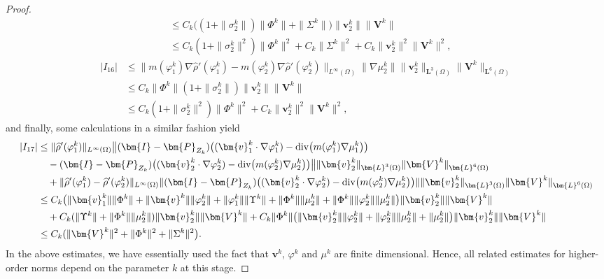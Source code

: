 \documentclass[11pt,reqno]{amsart}
\def\div{\mathrm{div}}
\def\vv{\bm{v}}
\begin{document}
\begin{proof}
\begin{align*}
&\leq C_k\big((1+\| \sigma^k_2\|)\| \Phi^k\|
+ \| \Sigma^k\|\big) \| \vv^k_2\| \|\bm{V}^k\|
\\
&\leq C_k (1+\| \sigma^k_2\|^2) \| \Phi^k\|^2
+ C_k\|\Sigma^k\|^2 + C_k\| \vv^k_2\|^2 \|\bm{V}^k\|^2,
\end{align*}
%
\begin{align*}
|I_{16}|
&\leq \|m(\varphi^k_1)\nabla \widehat{\rho}'(\varphi^k_1)
-m(\varphi^k_2)\nabla \widehat{\rho}'(\varphi^k_2)\|_{L^\infty(\Omega)}
\| \nabla \mu^k_2\| \|\vv^k_2\|_{\bm{L}^3(\Omega)} \|\bm{V}^k\|_{\bm{L}^6(\Omega)}
\\
&\leq C_k\|\Phi^k\|(1+\|\sigma_2^k\|)\| \vv^k_2\| \|\bm{V}^k\|
\\
&\leq C_k (1+\| \sigma^k_2\|^2) \| \Phi^k\|^2
+ C_k\| \vv^k_2\|^2 \|\bm{V}^k\|^2,
\end{align*}
%
and finally, some calculations in a similar fashion yield
%
\begin{align*}
|I_{17}|
&\leq \|\widehat{\rho}'(\varphi^k_1)\|_{L^\infty(\Omega)}
\big\|(\bm{I}-\bm{P}_{Z_{k}}) \big((\bm{v}_1^k\cdot\nabla\varphi^k_1)-\div \big(m(\varphi^k_1)\nabla \mu^k_1\big)\big)
\notag\\
&\quad -(\bm{I}-\bm{P}_{Z_{k}}) \big((\bm{v}_2^k\cdot\nabla\varphi^k_2)-\div \big(m(\varphi^k_2)\nabla \mu^k_2\big)\big)\big\|
\|\vv_2^k\|_{\bm{L}^3(\Omega)} \|\bm{V}^k\|_{\bm{L}^6(\Omega)}
\notag\\
&\quad + \|\widehat{\rho}'(\varphi^k_1)- \widehat{\rho}'(\varphi^k_2)\|_{L^\infty(\Omega)} \|(\bm{I}-\bm{P}_{Z_{k}}) \big((\bm{v}_2^k\cdot\nabla\varphi^k_2)-\div \big(m(\varphi^k_2)\nabla \mu^k_2\big)\big)\| \|\vv_2^k\|_{\bm{L}^3(\Omega)} \|\bm{V}^k\|_{\bm{L}^6(\Omega)}
\notag\\
&\leq C_k\big( \|\vv^k_1\| \|\Phi^k\|
+ \|\vv^k\|\|\varphi^k_2\|
+ \|\varphi^k_1\|\|\Upsilon^k\|
+ \|\Phi^k\|\|\mu^k_2\|
+ \|\Phi^k\|\|\varphi^k_2\|\|\mu^k_2\|\big)
\|\vv_2^k\| \|\bm{V}^k\|
\notag\\
&\quad + C_k(\|\Upsilon^k\|
+ \|\Phi^k\|\|\mu^k_2\|) \|\vv_2^k\| \|\bm{V}^k\|
+ C_k\|\Phi^k\| \big(\|\vv^k_2\| \|\varphi^k_2\|
+ \|\varphi^k_2\| \|\mu_2^k\|
+ \|\mu^k_2\|\big) \|\vv_2^k\| \|\bm{V}^k\|
\notag\\
&\leq C_k(\|\bm{V}^k\|^2 + \|\Phi^k\|^2 + \|\Sigma^k\|^2\big).
\end{align*}
%
In the above estimates, we have essentially used the fact that $\bm{v}^k$, $\varphi^k$ and $\mu^k$ are finite dimensional. Hence, all related estimates for higher-order norms depend on the parameter $k$ at this stage.


\end{proof}
\end{document}
